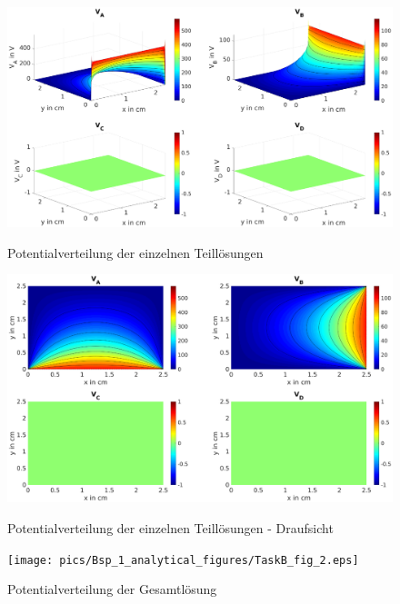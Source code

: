 \begin{figure}[H]
  \centering
  		\includegraphics[width=1.0\textwidth]{pics/Bsp_1_analytical_figures/TaskB_fig_1.eps}
  \label{fig:Ana:TaskB:Individual}
  \caption{Potentialverteilung der einzelnen Teillösungen}
\end{figure}

\begin{figure}[H]
  \centering
  		\includegraphics[width=1.0\textwidth]{pics/Bsp_1_analytical_figures/TaskB_fig_3.eps}
  \label{fig:Ana:TaskB:IndividualRot}
  \caption{Potentialverteilung der einzelnen Teillösungen - Draufsicht}
\end{figure}


\begin{figure}[H]
  \centering
  		\texttt{[image: pics/Bsp\_1\_analytical\_figures/TaskB\_fig\_2.eps]}
  \label{fig:Ana:TaskB:Complete}
  \caption{Potentialverteilung der Gesamtlösung}
\end{figure}

